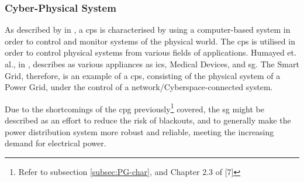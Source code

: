 \subsubsection{Cyber-Physical System}

As described by \citeauthor{humayed2017cyber} in \cite{humayed2017cyber}, a \acrfull{cps} is characterised by using a computer-based system in order to control and monitor systems of the physical world. The \acrshort{cps} is utilised in order to control physical systems from various fields of applications. Humayed et. al., in \cite{humayed2017cyber}, describes as various appliances as \acrfull{ics}, Medical Devices, and \acrlong{sg}.
The Smart Grid, therefore, is an example of a \acrfull{cps}, consisting of the physical system of a Power Grid, under the control of a network/Cyberspace-connected system. 

Due to the shortcomings of the \acrshort{cpg} previously\footnote{Refer to subsection \ref{subsec:PG-char}, and Chapter 2.3 of [7]} covered, the \acrshort{sg} might be described as an effort to reduce the risk of blackouts, and to generally make the power distribution system more robust and reliable, meeting the increasing demand for electrical power.
 
